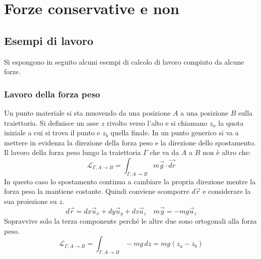 \documentclass[10pt,a4paper]{book}
\begin{document}
\section{Forze conservative e non}

\subsection{Esempi di lavoro}

Si espongono in seguito alcuni esempi di calcolo di lavoro compiuto da alcune forze.

\subsubsection{Lavoro della forza peso}

Un punto materiale si sta muovendo da una posizione $A$ a una posizione $B$ sulla traiettoria. Si definisce un asse $z$ rivolto verso l'alto e si chiamano $z_a$ la quota iniziale a cui si trova il punto e $z_b$ quella finale. In un punto generico si va a mettere in evidenza la direzione della forza peso e la direzione dello spostamento. Il lavoro della forza peso lungo la traiettoria $\Gamma$ che va da $A$ a $B$ non è altro che:
\[
	\mathcal{L}_{\Gamma, A \to B}=\int_{\Gamma, A \to B} m\vec{g} \cdot \vec{dr}
\]
In questo caso lo spostamento continua a cambiare la propria direzione mentre la forza peso la mantiene costante. Quindi conviene scomporre $d\vec{r}$ e considerare la sua proiezione su $z$.
\[
	d\vec{r}=dx\vec{u}_x+dy\vec{u}_y+dz\vec{u}_z \quad m\vec{g}=-mg\vec{u}_z
\]
Sopravvive solo la terza componente perché le altre due sono ortogonali alla forza peso.
\[
	\boxed{\mathcal{L}_{\Gamma, A \to B}=\int_{\Gamma, A \to B} -mg\,dz=mg(z_a-z_b)}
\]
\end{document}
